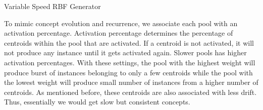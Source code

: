 \begin{algorithm}[htbp]
    \caption{Variable Speed RBF Generator}
    \label{alg:vsrbf}
    \DontPrintSemicolon
      
    
    
\end{algorithm}

To mimic concept evolution and recurrence, we associate each pool with an activation percentage. Activation percentage determines the percentage of centroids within the pool that are activated. If a centroid is not activated, it will not produce any instance until it gets activated again. Slower pools has higher activation percentages. With these settings, the pool with the highest weight will produce burst of instances belonging to only a few centroids while the pool with the lowest weight will produce small number of instances from a higher number of centroids. As mentioned before, these centroids are also associated with less drift. Thus, essentially we would get slow but consistent concepts.


